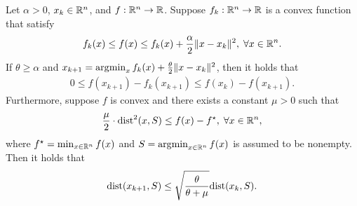 \documentclass[11pt]{article}
\begin{document}
\begin{theorem}
    \label{thm:error-quadratic}
     Let $\alpha > 0$, $x_k \in \mathbb{R}^n$, and $f:\mathbb{R}^n \to \mathbb{R}$. Suppose $f_k :\mathbb{R}^n \to \mathbb{R} $ is a convex function that satisfy 
    \begin{equation}
    \label{eq:close-upper}
        f_k(x) \leq f(x) \leq f_k(x) + \frac{\alpha}{2}\|x - x_k\|^2, \; \forall x \in \mathbb{R}^n.
    \end{equation}
    If $\theta \geq \alpha$ and $x_{k+1} = \operatorname*{\arg\!\min}_{x} f_k(x) + \frac{\theta}{2}\|x - x_k\|^2$, then it holds that
    \begin{align*}
    0 \leq f(x_{k+1}) - f_k(x_{k+1}) \leq  f(x_k)  - f(x_{k+1}).
\end{align*}
Furthermore, suppose $f$ is convex and there exists a constant $\mu > 0$ such that  
\begin{equation}
    \label{eq:QG-f}
    \frac{\mu}{2} \cdot \mathrm{dist}^2(x,S) \leq f(x) - f^\star,\; \forall x \in \mathbb{R}^n,
\end{equation}
where $f^\star = \min_{x\in \mathbb{R}^n} f(x)$ and $S = \operatorname*{\arg\!\min}_{x\in \mathbb{R}^n} f(x)$ is assumed to be nonempty. Then it holds that
\begin{align*}
    \mathrm{dist}(x_{k+1},S) \leq \sqrt{\frac{\theta}{\theta +\mu}}\mathrm{dist}(x_k,S).
\end{align*}
\end{theorem}
\end{document}

